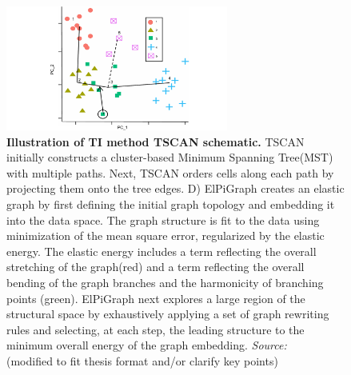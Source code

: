 \begin{description}
    \begin{figure}[ht!]
    	\centering
    	\includegraphics[width=0.65\textwidth]{TI_Alg_TSCAN/fig}
    	\vspace{0.1cm}
    	\caption[Illustration of TI method TSCAN schematic.]{\textbf{Illustration of TI method TSCAN schematic.}
    	TSCAN initially constructs a cluster-based Minimum Spanning Tree(MST) with multiple paths. Next, TSCAN orders cells along each path by projecting them onto the tree edges. 
    	D) ElPiGraph creates an elastic graph by first defining the initial graph topology and embedding it into the data space. The graph structure is fit to the data using minimization of the mean square error, regularized by the elastic energy. The elastic energy includes a term reflecting the overall stretching of the graph(red) and a term reflecting the overall bending of the graph branches and the harmonicity of branching points (green). ElPiGraph next explores a large region of the structural space by exhaustively applying a set of graph rewriting rules and selecting, at each step, the leading structure to the minimum overall energy of the graph embedding. \emph{Source: ~\cite{ji2016tscan}} (modified to fit thesis format and/or clarify key points)
    	}
    	\label{fig:TI_Alg_TSCAN}
    \end{figure}
\end{description}

